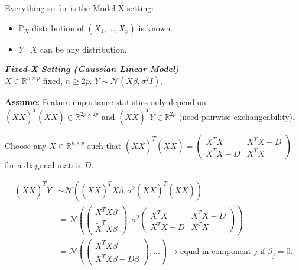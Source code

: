 \vspace{0.3cm}
\noindent \underline{Everything so far is the Model-X setting:}
\begin{itemize}
    \item $\mathbb{P}_X$ distribution of $(X_1, \dots, X_p)$ is known.
    \item $Y \mid X$ can be any distribution.
\end{itemize}


\emph{\textbf{Fixed-X Setting (Gaussian Linear Model)}}\\
$X \in \mathbb{R}^{n \times p}$ fixed, $n \ge 2p$. $Y \sim \mathcal{N}(X\beta, \sigma^2 I)$.

\textbf{Assume:} Feature importance statistics only depend on $(X \tilde{X})^T(X \tilde{X}) \in \mathbb{R}^{2p \times 2p}$ and $(X \tilde{X})^T Y \in \mathbb{R}^{2p}$ (need pairwise exchangeability).

Choose any $\tilde{X} \in \mathbb{R}^{n \times p}$ such that $(X \tilde{X})^T(X \tilde{X}) = \begin{pmatrix} X^T X & X^T X - D \\ X^T X - D & X^T X \end{pmatrix}$ for a diagonal matrix $D$.

\begin{align*}
    (X \tilde{X})^T Y &\sim \mathcal{N}\left( (X \tilde{X})^T X\beta, \sigma^2 (X \tilde{X})^T(X \tilde{X}) \right) \\
    &= \mathcal{N} \left( \begin{pmatrix} X^T X \beta \\ \tilde{X}^T X \beta \end{pmatrix}, \sigma^2 \begin{pmatrix} X^T X & X^T X - D \\ X^T X - D & X^T X \end{pmatrix} \right) \\
    &= \mathcal{N} \left( \begin{pmatrix} X^T X \beta \\ X^T X \beta - D\beta \end{pmatrix}, \dots \right) 
    \longrightarrow \text{equal in component } j \text{ if } \beta_j = 0.
\end{align*}

